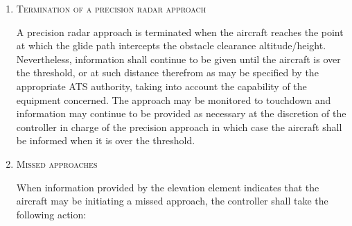 \begin{enumeratesc}
\begin{enumerate}[labelindent=0pt,itemsep=0.2cm]
        \item \textsc{Termination of a precision radar approach}
        \par\noindent A precision radar approach is terminated when the aircraft reaches the point at which the glide path intercepts the obstacle clearance altitude/height. Nevertheless, information shall continue to be given until the aircraft is over the threshold, or at such distance therefrom as may be specified by the appropriate ATS authority, taking into account the capability of the equipment concerned. The approach may be monitored to touchdown and information may continue to be provided as necessary at the discretion of the controller in charge of the precision approach in which case the aircraft shall be informed when it is over the threshold.

        \item \textsc{Missed approaches}
        \par\noindent When information provided by the elevation element indicates that the aircraft may be initiating a missed approach, the controller shall take the following action:
    \end{enumerate}
\end{enumeratesc}